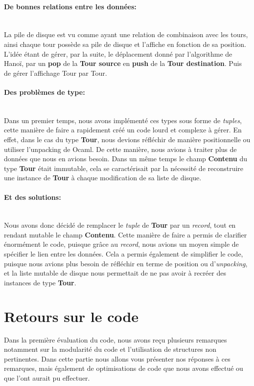 \documentclass[a4paper,11pt]{article}
\begin{document}
\paragraph{De bonnes relations entre les données:}\mbox{}\\
La pile de disque est vu comme ayant une relation de combinaison avec les tours, ainsi chaque tour  \og possède \fg sa pile de disque et l'affiche en fonction de sa position.
L'idée étant de gérer, par la suite, le déplacement donné par l'algorithme de Hanoï, par un \textbf{pop} de la \textbf{Tour source} en \textbf{push} de la \textbf{Tour destination}.
Puis de gérer l'affichage Tour par Tour. 


\paragraph{Des problèmes de type:}\mbox{}\\
Dans un premier temps, nous avons implémenté ces types sous forme de \textit{tuples}, cette manière de faire a rapidement créé un code lourd et complexe à gérer.
En effet, dans le cas du type \textbf{Tour}, nous devions réfléchir de manière positionnelle ou utiliser l'unpacking de Ocaml.
De cette manière, nous avions à traiter plus de données que nous en avions besoin.
Dans un même temps le \og champ \fg \textbf{Contenu} du type \textbf{Tour} était immutable,
cela se caractérisait par la nécessité de reconstruire une instance de \textbf{Tour} à chaque modification de sa liste de disque.
\paragraph{Et des solutions:}\mbox{}\\
Nous avons donc décidé de remplacer le \textit{tuple} de \textbf{Tour} par un \textit{record}, tout en rendant mutable le champ \textbf{Contenu}.
Cette manière de faire a permis de clarifier énormément le code, puisque grâce au \textit{record}, nous avions un moyen simple de spécifier le lien entre les données.
Cela a permis également de simplifier le code, puisque nous avions plus besoin de réfléchir en terme de position ou d'\textit{unpacking}, et la liste mutable de disque nous permettait de ne pas avoir à recréer des instances de type \textbf{Tour}.
\newpage
\section{Retours sur le code}
Dans la première évaluation du code, nous avons reçu plusieurs remarques notamment sur la modularité du code et l'utilisation de structures non pertinentes.
Dans cette partie nous allons vous présenter nos réponses à ces remarques, mais également de optimisations de code que nous avons effectué ou que l'ont aurait pu effectuer.
\end{document}
